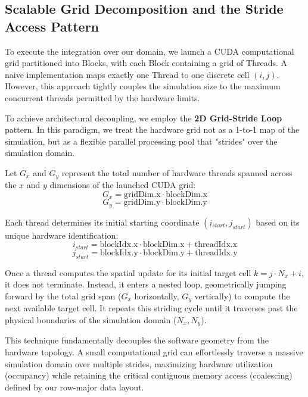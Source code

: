 \documentclass[12pt,a4paper]{article}
\begin{document}
\subsection{Scalable Grid Decomposition and the Stride Access Pattern}
To execute the integration over our domain, we launch a CUDA computational grid partitioned into Blocks, with each Block containing a grid of Threads. A naive implementation maps exactly one Thread to one discrete cell $(i, j)$. However, this approach tightly couples the simulation size to the maximum concurrent threads permitted by the hardware limits. 

To achieve architectural decoupling, we employ the \textbf{2D Grid-Stride Loop} pattern. In this paradigm, we treat the hardware grid not as a 1-to-1 map of the simulation, but as a flexible parallel processing pool that "strides" over the simulation domain.

Let $G_x$ and $G_y$ represent the total number of hardware threads spanned across the $x$ and $y$ dimensions of the launched CUDA grid:
$$G_x = \text{gridDim.x} \cdot \text{blockDim.x}$$
$$G_y = \text{gridDim.y} \cdot \text{blockDim.y}$$

Each thread determines its initial starting coordinate $(i_{start}, j_{start})$ based on its unique hardware identification:
$$i_{start} = \text{blockIdx.x} \cdot \text{blockDim.x} + \text{threadIdx.x}$$
$$j_{start} = \text{blockIdx.y} \cdot \text{blockDim.y} + \text{threadIdx.y}$$

Once a thread computes the spatial update for its initial target cell $k = j \cdot N_x + i$, it does not terminate. Instead, it enters a nested loop, geometrically jumping forward by the total grid span ($G_x$ horizontally, $G_y$ vertically) to compute the next available target cell. It repeats this striding cycle until it traverses past the physical boundaries of the simulation domain ($N_x, N_y$).

This technique fundamentally decouples the software geometry from the hardware topology. A small computational grid can effortlessly traverse a massive simulation domain over multiple strides, maximizing hardware utilization (occupancy) while retaining the critical contiguous memory access (coalescing) defined by our row-major data layout.
\end{document}

